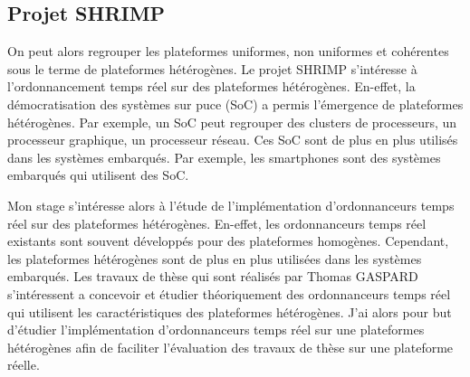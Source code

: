 \subsection{Projet SHRIMP}

On peut alors regrouper les plateformes uniformes, non uniformes et cohérentes sous le terme de plateformes hétérogènes. Le projet SHRIMP s'intéresse à l'ordonnancement temps réel sur des plateformes hétérogènes. En-effet, la démocratisation des systèmes sur puce (SoC) a permis l'émergence de plateformes hétérogènes. Par exemple, un SoC peut regrouper des clusters de processeurs, un processeur graphique, un processeur réseau. Ces SoC sont de plus en plus utilisés dans les systèmes embarqués. Par exemple, les smartphones sont des systèmes embarqués qui utilisent des SoC. 

Mon stage s'intéresse alors à l'étude de l'implémentation d'ordonnanceurs temps réel sur des plateformes hétérogènes. En-effet, les ordonnanceurs temps réel existants sont souvent développés pour des plateformes homogènes. Cependant, les plateformes hétérogènes sont de plus en plus utilisées dans les systèmes embarqués. Les travaux de thèse qui sont réalisés par Thomas GASPARD s'intéressent a concevoir et étudier théoriquement des ordonnanceurs temps réel qui utilisent les caractéristiques des plateformes hétérogènes. J'ai alors pour but d'étudier l'implémentation d'ordonnanceurs temps réel sur une plateformes hétérogènes afin de faciliter l'évaluation des travaux de thèse sur une plateforme réelle.






